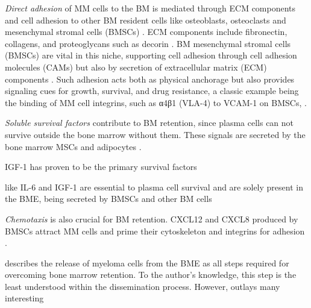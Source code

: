 \emph{Direct adhesion} of MM cells to the BM is mediated through ECM
components and cell adhesion to other BM resident cells like osteoblasts,
osteoclasts and mesenchymal stromal cells (BMSCs)
\cite{bouzerdanAdhesionMoleculesMultiple2022}. ECM components include
fibronectin, collagens, and proteoglycans such as decorin
\cite{huDecorinmediatedSuppressionTumorigenesis2021,
    huangHigherDecorinLevels2015,katzAdhesionMoleculesLifelines2010,
    kiblerAdhesiveInteractionsHuman1998}. BM mesenchymal stromal cells (BMSCs) are
vital in this niche, supporting cell adhesion through cell adhesion molecules
(CAMs) but also by secretion of extracellular matrix (ECM) components
\cite{katzAdhesionMoleculesLifelines2010}. Such adhesion acts both as physical
anchorage but also provides signaling cues for growth, survival, and drug
resistance, a classic example being the binding of MM cell integrins, such as
α4β1 (VLA-4) to VCAM-1 on BMSCs, \cite{bouzerdanAdhesionMoleculesMultiple2022}.


\emph{Soluble survival factors} contribute to BM retention, since plasma cells
can not survive outside the bone marrow without them. These signals are secreted
by the bone marrow MSCs and adipocytes
\cite{kiblerAdhesiveInteractionsHuman1998,
garcia-ortizRoleTumorMicroenvironment2021}.


IGF-1 has proven to be the primary survival factors \cite{sprynskiRoleIGF1Major2009}

like IL-6 and IGF-1 are essential to plasma cell
survival and are solely present in the BME, being secreted by BMSCs and other BM
cells \cite{sprynskiRoleIGF1Major2009}

\emph{Chemotaxis} is also crucial for
BM retention. CXCL12 and CXCL8 produced by BMSCs attract MM cells and prime
their cytoskeleton and integrins for adhesion
\cite{aggarwalChemokinesMultipleMyeloma2006,alsayedMechanismsRegulationCXCR42007}.


%
\label{sec:intro_myeloma_release}%
\citet{zeissigTumourDisseminationMultiple2020} describes the release of myeloma
cells from the BME as all steps required for overcoming bone marrow retention.
To the author's knowledge, this step is 
the least understood within the dissemination process. However, \citet{zeissigTumourDisseminationMultiple2020}
outlays many interesting 

 

